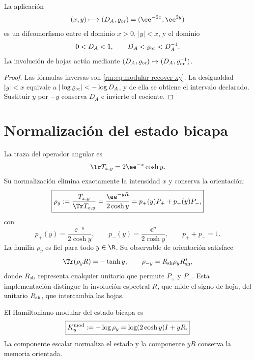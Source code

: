 \begin{proposition}
\label{rm:prop:modular-separation}
La aplicaci\'on
\[
 (x,y)\longmapsto(D_A,\varrho_{\rm or})
 =(\ee^{-2x},\ee^{2y})
\]
es un difeomorfismo entre el dominio \(x>0\), \(|y|<x\), y el dominio
\[
 0<D_A<1,
 \qquad
 D_A<\varrho_{\rm or}<D_A^{-1}.
\]
La involuci\'on de hojas act\'ua mediante
\(
(D_A,\varrho_{\rm or})\mapsto(D_A,\varrho_{\rm or}^{-1})
\).
\end{proposition}

\begin{proof}
Las f\'ormulas inversas son \cref{rm:eq:modular-recover-xy}. La desigualdad
\(|y|<x\) equivale a
\(|\log\varrho_{\rm or}|<-\log D_A\), y de ella se obtiene el intervalo
declarado. Sustituir \(y\) por \(-y\) conserva \(D_A\) e invierte el
cociente.
\end{proof}

\section{Normalizaci\'on del estado bicapa}

La traza del operador angular es
\begin{equation}
 \Tr T_{x,y}=2\ee^{-x}\cosh y.
 \label{rm:eq:modular-trace-T}
\end{equation}
Su normalizaci\'on elimina exactamente la intensidad \(x\) y conserva la
orientaci\'on:
\begin{equation}
 \boxed{
 \rho_y:=\frac{T_{x,y}}{\Tr T_{x,y}}
 =\frac{\ee^{-yR}}{2\cosh y}
 =p_+(y)P_++p_-(y)P_- ,}
 \label{rm:eq:modular-rho}
\end{equation}
con
\begin{equation}
 p_+(y)=\frac{\ee^{-y}}{2\cosh y},
 \qquad
 p_-(y)=\frac{\ee^{y}}{2\cosh y},
 \qquad
 p_++p_-=1.
 \label{rm:eq:modular-probabilities}
\end{equation}
La familia \(\rho_y\) es fiel para todo \(y\in\R\). Su observable de
orientaci\'on satisface
\begin{equation}
 \Tr(\rho_yR)=-\tanh y,
 \qquad
 \rho_{-y}=R_{\rm sh}\rho_yR_{\rm sh}^*,
 \label{rm:eq:modular-orientation-expectation}
\end{equation}
donde \(R_{\rm sh}\) representa cualquier unitario que permute
\(P_+\) y \(P_-\). Esta implementaci\'on distingue la involuci\'on
espectral \(R\), que mide el signo de hoja, del unitario \(R_{\rm sh}\),
que intercambia las hojas.

\begin{definition}
\label{rm:def:holographic-modular-hamiltonian}
El Hamiltoniano modular del estado bicapa es
\begin{equation}
 \boxed{
 K_y^{\rm mod}:=-\log\rho_y
 =\log(2\cosh y)I+yR.}
 \label{rm:eq:modular-Hamiltonian}
\end{equation}
La componente escalar normaliza el estado y la componente \(yR\) conserva
la memoria orientada.
\end{definition}

